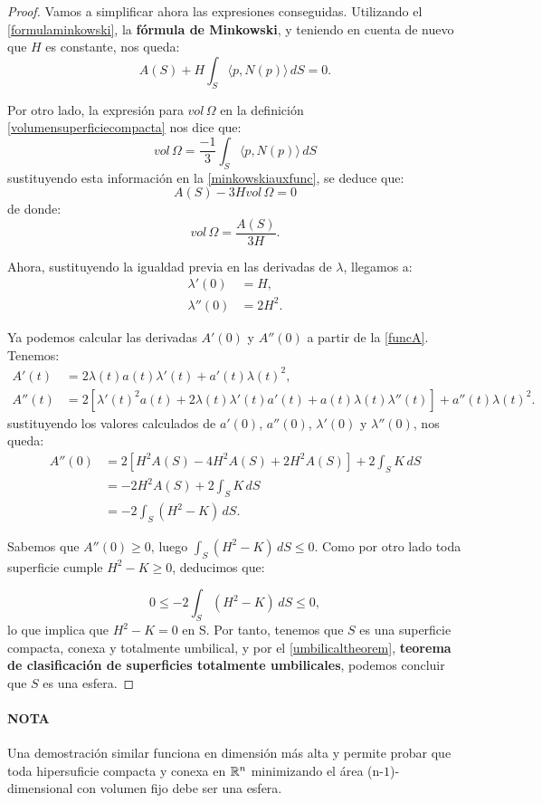 \begin{proof}
Vamos a simplificar ahora las expresiones conseguidas. Utilizando el \autoref{formulaminkowski}, la \textbf{fórmula de Minkowski}, y teniendo en cuenta de nuevo que $H$ es constante, nos queda:
%
\begin{equation}\label{minkowskiauxfunc}
    A(S) + H\int_S \langle p, N(p) \rangle \, dS = 0.
\end{equation}

Por otro lado, la expresión para $vol \, \Omega$ en la definición \autoref{volumensuperficiecompacta} nos dice que:
%
\begin{equation*}
    vol \, \Omega = \frac{-1}{3}\int_S \langle p, N(p) \rangle \, dS
\end{equation*}
%
sustituyendo esta información en la \autoref{minkowskiauxfunc}, se deduce que:
%
\begin{equation*}
    A(S) - 3H vol \, \Omega = 0
\end{equation*}
%
de donde:
%
\begin{equation*}
    vol \, \Omega = \frac{A(S)}{3H}.
\end{equation*}

Ahora, sustituyendo la igualdad previa en las derivadas de $\lambda$, llegamos a:
%
\begin{align*}
    \lambda'(0) &= H, \\
    \lambda''(0) &= 2H^2.
\end{align*}

Ya podemos calcular las derivadas $A'(0)$ y $A''(0)$ a partir de la \autoref{funcA}. Tenemos:
%
\begin{align*}
    A'(t) &= 2\lambda(t)a(t)\lambda'(t) + a'(t)\lambda(t)^2, \\
    A''(t) &= 2\left [ \lambda'(t)^2a(t) + 2\lambda(t)\lambda'(t)a'(t) + a(t)\lambda(t)\lambda''(t) \right] + a''(t)\lambda(t)^2.
\end{align*}
%
sustituyendo los valores calculados de $a'(0)$, $a''(0)$, $\lambda'(0)$ y $\lambda''(0)$, nos queda:
%
\begin{align*}
    A''(0) &= 2\left[ H^2A(S) -4H^2A(S) + 2H^2A(S) \right] + 2\int_S K \, dS \\
    &= -2H^2A(S) + 2\int_S K \, dS \\
    &= -2\int_S (H^2-K) \, dS.
\end{align*}

Sabemos que $A''(0) \geq 0$, luego $\int_S (H^2-K) \, dS \leq 0$. Como por otro lado toda superficie cumple $H^2-K \geq 0$, deducimos que:

\begin{equation*}
    0 \leq -2\int_S (H^2-K) \, dS \leq 0,
\end{equation*}
%
lo que implica que $H^2-K = 0$ en S. Por tanto, tenemos que $S$ es una superficie compacta, conexa y totalmente umbilical, y por el \autoref{umbilicaltheorem}, \textbf{teorema de clasificación de superficies totalmente umbilicales}, podemos concluir que $S$ es una esfera.
\end{proof}

\paragraph{NOTA}{Una demostración similar funciona en dimensión más alta y permite probar que toda hipersuficie compacta y conexa en $\mathbb{R}^n$ minimizando el área (n-$1$)-dimensional con volumen fijo debe ser una esfera.}
